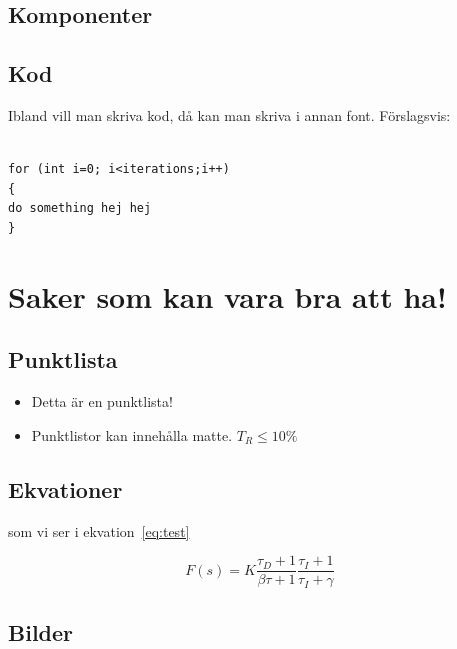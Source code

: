 \documentclass[a4paper,12pt,fleqn]{article}
\begin{document}
\subsection{Komponenter}



\subsection{Kod}
Ibland vill man skriva kod, då kan man skriva i annan font. Förslagsvis:
\\ %

\begin {lstlisting}

for (int i=0; i<iterations;i++)
{
do something hej hej
}
\end{lstlisting}

\section{Saker som kan vara bra att ha!}

\subsection{Punktlista}
\begin{itemize}
  \item Detta är en punktlista! 
  \item Punktlistor kan innehålla matte. $T_R \leq 10\%$
\end{itemize}

\subsection{Ekvationer}

som vi ser i ekvation~\ref{eq:test} %

\begin{equation}
F(s)= K\frac{\tau_D+1}{\beta\tau+1}\frac{\tau_I+1}{\tau_I+\gamma}	
	\label{eq:test} %
\end{equation} 

\subsection{Bilder}
\end{document}
